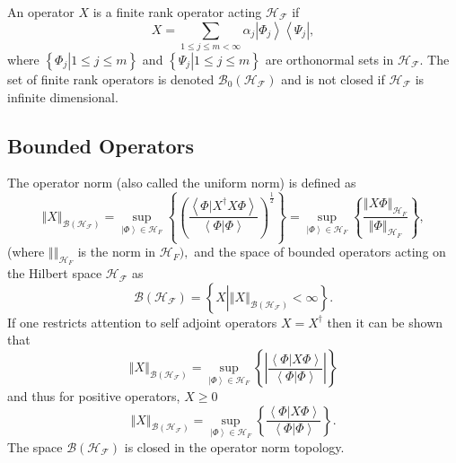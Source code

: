 \documentclass[aps,preprint,amsfonts,amssymb,showpacs,showkeys]{revtex4}%
\begin{document}
An operator $X$ is a finite rank operator acting $\mathcal{H}_{\mathcal{F}}$
if
\begin{equation}
X=\sum_{1\leq j\leq m<\infty}\alpha_{j}\left\vert \Phi_{j}\right\rangle
\left\langle \Psi_{j}\right\vert ,
\end{equation}
where $\left\{  \left.  \Phi_{j}\right\vert 1\leq j\leq m\right\}  $ and
$\left\{  \left.  \Psi_{j}\right\vert 1\leq j\leq m\right\}  $ are orthonormal
sets in $\mathcal{H}_{\mathcal{F}}.$ The set of finite rank operators is
denoted $\mathcal{B}_{0}\left(  \mathcal{H}_{\mathcal{F}}\right)  $ and is not
closed if $\mathcal{H}_{\mathcal{F}}$ is infinite dimensional.

\subsection{Bounded Operators}

The operator norm (also called the uniform norm) is defined as
\begin{equation}
\left\Vert X\right\Vert _{\mathcal{B}\left(  \mathcal{H}_{\mathcal{F}}\right)
}=\sup_{\left\vert \Phi\right\rangle \in\mathcal{H}_{F}}\left\{  \left(
\frac{\left\langle \left.  \Phi\right\vert X^{\dagger}X\Phi\right\rangle
}{\left\langle \left.  \Phi\right\vert \Phi\right\rangle }\right)  ^{\frac
{1}{2}}\right\}  =\sup_{\left\vert \Phi\right\rangle \in\mathcal{H}_{F}%
}\left\{  \frac{\left\Vert X\Phi\right\Vert _{\mathcal{H}_{F}}}{\left\Vert
\Phi\right\Vert _{\mathcal{H}_{F}}}\right\}  ,
\end{equation}
(where $\left\Vert {}\right\Vert _{\mathcal{H}_{F}}$ is the norm in
$\mathcal{H}_{F}),$ and the space of bounded operators acting on the Hilbert
space $\mathcal{H}_{\mathcal{F}}$ as
\begin{equation}
\mathcal{B}\left(  \mathcal{H}_{\mathcal{F}}\right)  =\left\{  X\left\vert
\left\Vert X\right\Vert _{\mathcal{B}\left(  \mathcal{H}_{\mathcal{F}}\right)
}<\infty\right.  \right\}  .
\end{equation}
If one restricts attention to self adjoint operators $X=X^{\dagger}$ then it
can be shown that
\begin{equation}
\left\Vert X\right\Vert _{\mathcal{B}\left(  \mathcal{H}_{\mathcal{F}}\right)
}=\sup_{\left\vert \Phi\right\rangle \in\mathcal{H}_{F}}\left\{  \left\vert
\frac{\left\langle \left.  \Phi\right\vert X\Phi\right\rangle }{\left\langle
\left.  \Phi\right\vert \Phi\right\rangle }\right\vert \right\}
\end{equation}
and thus for positive operators, $X\geq0$%
\begin{equation}
\left\Vert X\right\Vert _{\mathcal{B}\left(  \mathcal{H}_{\mathcal{F}}\right)
}=\sup_{\left\vert \Phi\right\rangle \in\mathcal{H}_{F}}\left\{
\frac{\left\langle \left.  \Phi\right\vert X\Phi\right\rangle }{\left\langle
\left.  \Phi\right\vert \Phi\right\rangle }\right\}  .
\end{equation}
The space $\mathcal{B}\left(  \mathcal{H}_{\mathcal{F}}\right)  $ is closed in
the operator norm topology.
\end{document}

